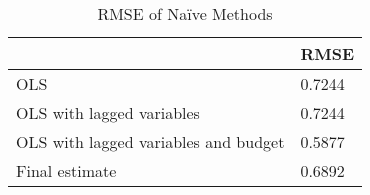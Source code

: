 \begin{table}[h!]
\caption{RMSE of Naïve Methods}
\label{naive_rmse}
\begin{tabular}{ll}
\toprule
 & RMSE \\
\midrule
OLS & 0.7244 \\
OLS with lagged variables & 0.7244 \\
OLS with lagged variables and budget & 0.5877 \\
Final estimate & 0.6892 \\
\bottomrule
\end{tabular}
\end{table}
